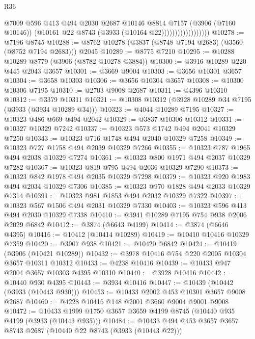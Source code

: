 \begin{lexlean}{R36}
\begin{coremodule}
                                  @7009
                                  @596
                                  @413
                                  @494
                                  @2030
                                  @2687
                                  @10146
                                  @8814
                                  @7157
                                  (@3906 (@7160 @10146))
                                  (@10161 @22 @8743 (@3933 (@10164 @22))))))))))))))))))
@10278 := @7196 @8745
@10288 := @8762 @10278 (@3837 (@8748 @7194 @2683) (@3560 (@8752 @7194 @2683))) @2045
@10289 := @8775 @7210
@10295 := @10288 @10289 @8779 (@3906 (@8782 @10278 @3884))
@10300 := @3916 @10289 @220 @445 @2043 @3657
@10301 := @3669 @9004
@10303 := @3656 @10301 @3657
@10304 := @3658 @10303
@10306 := @3656 @10304 @3657
@10308 := @10300 @10306 @7195
@10310 := @2703 @9008 @2687
@10311 := @4396 @10310
@10312 := @3379 @10311
@10321 := @10308 @10312 (@3928 @10289 @34 @7195 (@3933 (@3934 @10289 @34)))
@10323 := @4044 @10289 @7195
@10327 := @10323 @486 @669 @494 @2042
@10329 := @3837 @10306 @10312
@10331 := @10327 @10329 @7242
@10337 := @10323 @573 @1742 @494 @2041 @10329 @7250
@10343 := @10323 @716 @1748 @494 @2040 @10329 @7258
@10349 := @10323 @727 @1758 @494 @2039 @10329 @7266
@10355 := @10323 @787 @1965 @494 @2038 @10329 @7274
@10361 := @10323 @800 @1971 @494 @2037 @10329 @7282
@10367 := @10323 @819 @795 @494 @2036 @10329 @7290
@10373 := @10323 @842 @1978 @494 @2035 @10329 @7298
@10379 := @10323 @920 @1983 @494 @2034 @10329 @7306
@10385 := @10323 @970 @1828 @494 @2033 @10329 @7314
@10391 := @10323 @981 @1853 @494 @2032 @10329 @7322
@10397 := @10323 @567 @1506 @494 @2031 @10329 @7330
@10403 := @10323 @596 @413 @494 @2030 @10329 @7338
@10410 := @3941 @10289 @7195 @754 @938 @2006 @2029 @6842
@10412 := @3874 (@6643 @4199)
@10414 := @3874 (@6646 @4395)
@10416 := @10412 (@10414 @10289)
@10419 := @10410 @10416 @10329 @7359
@10420 := @3907 @938
@10421 := @10420 @6842
@10424 := @10419 (@3906 (@10421 @10289))
@10432 := @3978 @10416 @754 @220 @2005 @10304 @3657 @10311 @10312
@10433 := @4238 @10416
@10439 := @10433 @947 @2004 @3657 @10303 @4395 @10310
@10440 := @3928 @10416
@10442 := @10440 @930 @4395
@10443 := @3934 @10416
@10447 := @10439 (@10442 (@3933 (@10443 @930)))
@10453 := @10433 @2002 @453 @10301 @3657 @9008 @2687
@10460 := @4228 @10416 @148 @2001 @3660 @9004 @9001 @9008
@10472 := @10433 @1999 @1750 @3657 @3659 @4199 @8745 (@10440 @935 @4199 (@3933 (@10443 @935)))
@10484 := @10433 @494 @453 @3657 @3657 @8743 @2687 (@10440 @22 @8743 (@3933 (@10443 @22)))

\end{coremodule}
\end{lexlean}
